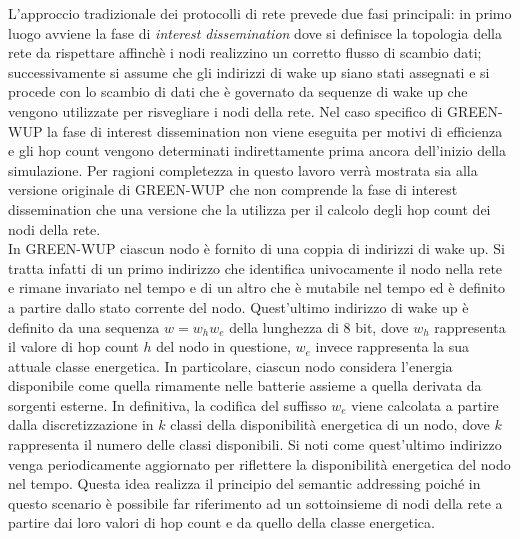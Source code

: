 \documentclass[binding=0.6cm,TFA]{sapthesis}
\begin{document}
L'approccio tradizionale dei protocolli di rete prevede due fasi principali: in primo luogo avviene la fase di \emph{interest dissemination} dove si
definisce la topologia della rete da rispettare affinchè i nodi realizzino un corretto flusso di scambio dati; successivamente si assume che gli
indirizzi di wake up siano stati assegnati e si procede con lo scambio di dati che è governato da sequenze di wake up che vengono utilizzate per
risvegliare i nodi della rete. Nel caso specifico di GREEN-WUP la fase di interest dissemination non viene eseguita per motivi di efficienza
e gli hop count vengono determinati indirettamente prima ancora dell'inizio della simulazione. Per ragioni completezza in questo lavoro verrà
mostrata sia alla versione originale di GREEN-WUP che non comprende la fase di interest dissemination che una versione che la utilizza per
il calcolo degli hop count dei nodi della rete.\\

In GREEN-WUP ciascun nodo è fornito di una coppia di indirizzi di wake up. Si tratta infatti di un primo indirizzo che identifica univocamente
il nodo nella rete e rimane invariato nel tempo e di un altro che è mutabile nel tempo ed è definito a partire dallo stato corrente del nodo.
Quest'ultimo indirizzo di wake up è definito da una sequenza $w=w_{h}w_{e}$ della lunghezza di 8 bit, dove $w_{h}$ rappresenta il valore di hop
count $h$ del nodo in questione, $w_{e}$ invece rappresenta la sua attuale classe energetica. In particolare, ciascun nodo considera
l'energia disponibile come quella rimamente nelle batterie assieme a quella derivata da sorgenti esterne. In definitiva, la codifica del suffisso
$w_{e}$ viene calcolata a partire dalla discretizzazione in $k$ classi della disponibilità energetica di un nodo, dove $k$ rappresenta il
numero delle classi disponibili. Si noti come quest'ultimo indirizzo venga periodicamente aggiornato per riflettere la disponibilità
energetica del nodo nel tempo. Questa idea realizza il principio del semantic addressing poiché in questo scenario è possibile far riferimento
ad un sottoinsieme di nodi della rete a partire dai loro valori di hop count e da quello della classe energetica. \\
\end{document}
